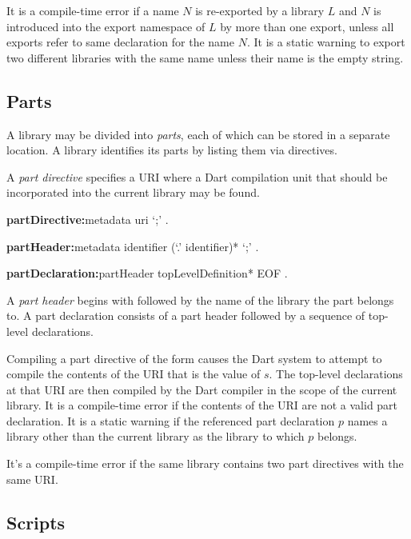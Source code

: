\documentclass{article}
\begin{document}
\LMHash{}
It is a compile-time error if a name $N$ is re-exported by a library $L$ and $N$ is introduced into the export namespace of $L$ by more than one export, unless all exports refer to same declaration for the name $N$.
It is a static warning to export two different libraries with the same name unless their name is the empty string.


\subsection{Parts}

\LMHash{}
A library may be divided into {\em parts}, each of which can be stored in a separate location.
A library identifies its parts by listing them via \PART{} directives.

\LMHash{}
A {\em part directive} specifies a URI where a Dart compilation unit that should be incorporated into the current library may be found.

\begin{grammar}
{\bf partDirective:}metadata \PART{} uri `{\escapegrammar ;}'
  .

{\bf partHeader:}metadata \PART{} \OF{} identifier (`{\escapegrammar .}' identifier)* `{\escapegrammar ;}'
  .

{\bf partDeclaration:}partHeader topLevelDefinition* EOF
  .
\end{grammar}

\LMHash{}
A {\em part header} begins with \PART{} \OF{} followed by the name of the library the part belongs to.
A part declaration consists of a part header followed by a sequence of top-level declarations.

\LMHash{}
Compiling a part directive of the form  causes the Dart system to attempt to compile the contents of the URI that is the value of $s$.
The top-level declarations at that URI are then compiled by the Dart compiler in the scope of the current library.
It is a compile-time error if the contents of the URI are not a valid part declaration.
It is a static warning if the referenced part declaration $p$ names a library other than the current library as the library to which $p$ belongs.

\LMHash{}
It's a compile-time error if the same library contains two part directives with the same URI.


\subsection{Scripts}
\end{document}
